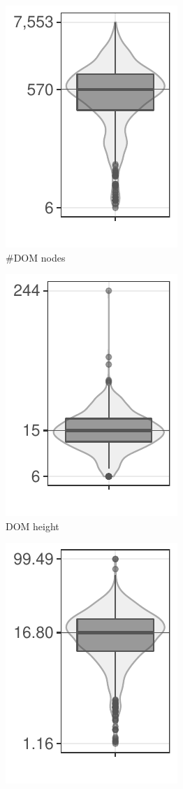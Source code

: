 \begin{figure}%
	\centering
	\begin{subfigure}[b]{0.32\linewidth}
		\centering
		\includegraphics[scale=0.64]{figures/number-of-dom-nodes}
		\caption{\#DOM nodes}
		\label{fig:number-of-dom-nodes}
	\end{subfigure}
	\begin{subfigure}[b]{0.32\linewidth}
		\centering
		\includegraphics[scale=0.64]{figures/dom-height-distribution}
		\caption{DOM height}
		\label{fig:dom-height-distribution}
	\end{subfigure}
	\begin{subfigure}[b]{0.32\linewidth}
		\centering
		\includegraphics[scale=0.64]{figures/elements-with-event-listeners-percentage}

\end{subfigure}
\end{figure}
